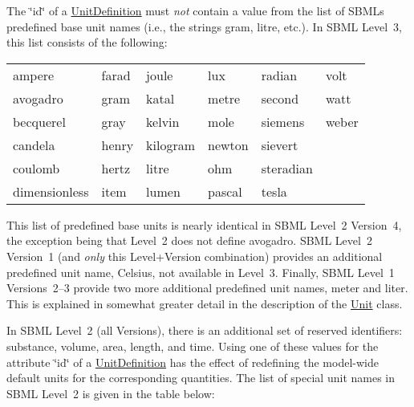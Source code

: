 \begin{DoxyItemize}
\item The \char`\"{}id\char`\"{} of a \hyperlink{class_unit_definition}{Unit\+Definition} must {\itshape not} contain a value from the list of S\+B\+ML\textquotesingle{}s predefined base unit names (i.\+e., the strings {\ttfamily gram}, {\ttfamily litre}, etc.). In S\+B\+ML Level~3, this list consists of the following\+:

\begin{DoxyParagraph}{}
\tabulinesep=1mm
\begin{longtabu} spread 0pt [c]{*{6}{|X[-1]}|}
\hline
ampere&farad&joule&lux&radian&volt  \\
avogadro&gram&katal&metre&second&watt  \\
becquerel&gray&kelvin&mole&siemens&weber  \\
candela&henry&kilogram&newton&sievert  \\
coulomb&hertz&litre&ohm&steradian  \\
dimensionless&item&lumen&pascal&tesla  \\
\end{longtabu}

\end{DoxyParagraph}
This list of predefined base units is nearly identical in S\+B\+ML Level~2 Version~4, the exception being that Level~2 does not define {\ttfamily avogadro}. S\+B\+ML Level~2 Version~1 (and {\itshape only} this Level+\+Version combination) provides an additional predefined unit name, {\ttfamily Celsius}, not available in Level~3. Finally, S\+B\+ML Level~1 Versions~2--3 provide two more additional predefined unit names, {\ttfamily meter} and {\ttfamily liter}. This is explained in somewhat greater detail in the description of the \hyperlink{class_unit}{Unit} class.


\begin{DoxyItemize}
\item In S\+B\+ML Level~2 (all Versions), there is an additional set of reserved identifiers\+: {\ttfamily substance}, {\ttfamily volume}, {\ttfamily area}, {\ttfamily length}, and {\ttfamily time}. Using one of these values for the attribute \char`\"{}id\char`\"{} of a \hyperlink{class_unit_definition}{Unit\+Definition} has the effect of redefining the model-\/wide default units for the corresponding quantities. The list of special unit names in S\+B\+ML Level~2 is given in the table below\+: 
\end{DoxyItemize}




\end{DoxyItemize}
